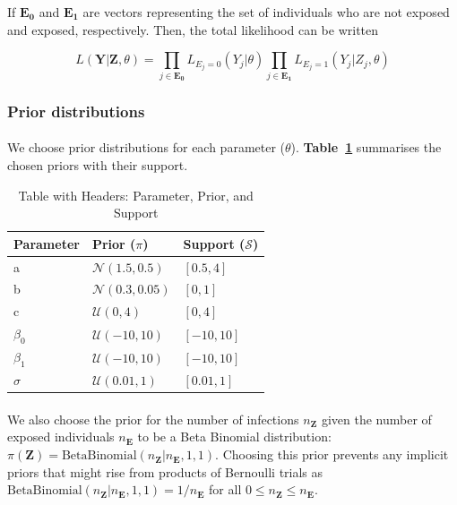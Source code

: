 If $\mathbf{E_0}$ and $\mathbf{E_1}$ are vectors representing the set of individuals who are not exposed and exposed, respectively. Then, the total likelihood can be written 

\begin{equation}
L(\mathbf{Y} | \mathbf{Z}, \theta) = \prod_{j \in \mathbf{E_0}}L_{E_j = 0}(Y_{j}| \theta) \prod_{j \in \mathbf{E_1}}L_{E_j = 1}(Y_{j}| Z_j, \theta) 
\end{equation}


\subsubsection{Prior distributions}

\paragraph{}We choose prior distributions for each parameter \pi($\theta$). \textbf{Table~\ref{tab:priorsA}} summarises the chosen priors with their support. 

\begin{table}[ht]
    \centering
    \begin{tabular}{|l|l|l|}
        \hline
        \textbf{Parameter} & \textbf{Prior ($\pi$)} & \textbf{Support ($\mathcal{S}$)} \\
        \hline
        a & $\mathcal{N}(1.5, 0.5)$ & $[0.5, 4]$ \\
        \hline
        b & $\mathcal{N}(0.3, 0.05)$ & $[0, 1]$ \\
        \hline
        c & $\mathcal{U}(0, 4)$ & $[0, 4]$ \\
        \hline
        $\beta_0$ & $\mathcal{U}(-10, 10)$ & $[-10, 10]$ \\
        \hline
        $\beta_1$ & $\mathcal{U}(-10, 10)$ & $[-10, 10]$ \\
        \hline
        $\sigma$ &  $\mathcal{U}(0.01, 1)$ & $[0.01, 1]$ \\
        \hline
    \end{tabular}
    \caption{Table with Headers: Parameter, Prior, and Support}
    \label{tab:priorsA}
\end{table}

\paragraph{}We also choose the prior for the number of infections $n_\mathbf{Z}$ given the number of exposed individuals $n_\mathbf{E}$ to be a Beta Binomial distribution: $\pi(\mathbf{Z}) = \text{BetaBinomial}(n_\mathbf{Z} | n_\mathbf{E}, 1, 1)$. Choosing this prior prevents any implicit priors that might rise from products of Bernoulli trials\cite{Hay2020-pr} as $\text{BetaBinomial}(n_\mathbf{Z} | n_\mathbf{E}, 1, 1) = 1 / n_\mathbf{E}$ for all $0 \leq n_\mathbf{Z} \leq n_\mathbf{E}$. 

